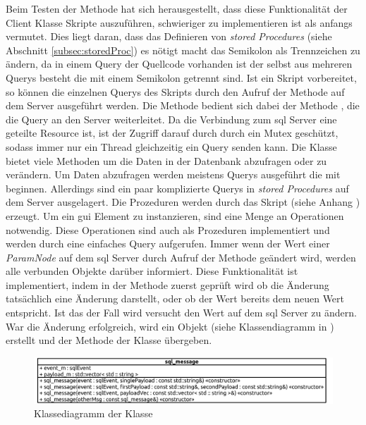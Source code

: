 Beim Testen der Methode hat sich herausgestellt, dass diese Funktionalität der  Client Klasse Skripte auszuführen, schwieriger zu implementieren ist als anfangs vermutet.
Dies liegt daran, dass das Definieren von \emph{stored Procedures} (siehe Abschnitt \ref{subsec:storedProc}) es nötigt macht das Semikolon als Trennzeichen zu ändern, 
da in einem Query der Quellcode vorhanden ist der selbst aus mehreren Querys besteht die mit einem Semikolon getrennt sind.
Ist ein Skript vorbereitet, so können die einzelnen Querys des Skripts durch den Aufruf der Methode  auf dem Server ausgeführt werden.
Die Methode  bedient sich dabei der Methode , die die Query an den Server weiterleitet.
Da die Verbindung zum \ac{sql} Server eine geteilte Resource ist, ist der Zugriff darauf durch  durch ein Mutex geschützt, sodass immer nur ein Thread gleichzeitig ein Query senden kann.
Die Klasse  bietet viele Methoden um die Daten in der Datenbank abzufragen oder zu verändern.
Um Daten abzufragen werden meistens Querys ausgeführt die mit  beginnen.
Allerdings sind ein paar komplizierte Querys in \emph{stored Procedures} auf dem Server ausgelagert.
Die Prozeduren werden durch das Skript  (siehe Anhang ) erzeugt.
Um ein \ac{gui} Element zu instanzieren, sind eine Menge an Operationen notwendig.
Diese Operationen sind auch als Prozeduren implementiert und werden durch eine einfaches  Query aufgerufen.
Immer wenn der Wert einer \emph{ParamNode} auf dem \ac{sql} Server durch Aufruf der Methode  geändert wird, werden alle verbunden  Objekte darüber informiert.
Diese Funktionalität ist implementiert, indem in der  Methode zuerst geprüft wird ob die Änderung tatsächlich eine Änderung darstellt, oder ob der Wert bereits dem neuen Wert entspricht.
Ist das der Fall wird versucht den Wert auf dem \ac{sql} Server zu ändern. War die Änderung erfolgreich, wird ein  Objekt (siehe Klassendiagramm in ) erstellt 
und der Methode  der Klasse  übergeben. 
\begin{figure}[ht]
  \centering
  \includegraphics[width=\textwidth]{content/hauptteil/umsetzungPoC/backend/uml/classesOfOverview/sql_message.pdf}
  \caption{Klassediagramm der Klasse }
  \label{fig:backend:classDiag:sqlMsg}
\end{figure}
